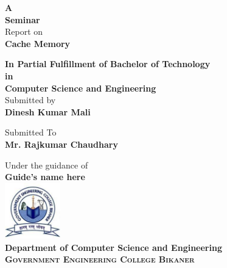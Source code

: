 \begin{titlepage}
\begin{center}
\textup{\small {\bf A \\Seminar } \\ Report on}\\[0.2in]
\Large \textbf { Cache Memory }\\[0.5in]

        \vspace{.2in}

      \textbf {In Partial Fulfillment of Bachelor of Technology \\in\\ Computer Science and Engineering}\\[0.5in]
\normalsize Submitted by \\
\textbf{Dinesh Kumar Mali}

\vspace{1cm}
\normalsize Submitted To  \\
\textbf{Mr. Rajkumar Chaudhary}


\vspace{1cm}
Under the guidance of\\
{\textbf{Guide's name here}}\\[0.2in]


\vspace{2cm}
\includegraphics[width=0.18\textwidth]{./Ecb_logo.png}\\[0.1in]
\large{\textbf{Department of Computer Science and Engineering}}\\
\normalsize
\textsc{\textbf{Government Engineering College Bikaner}}\\
\vspace{0.2cm}


\end{center}

\end{titlepage}
